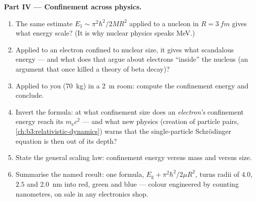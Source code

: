 \begin{problem}
\medskip\noindent\textbf{Part IV --- Confinement across physics.}
\begin{enumerate}[resume]
  \item The same estimate $E_1 \sim \pi^2\hbar^2/2MR^2$ applied to a
        nucleon in $R = \qty{3}{fm}$ gives what energy scale? (It is
        why nuclear physics speaks MeV.)
  \item Applied to an electron confined to nuclear size, it gives
        what scandalous energy --- and what does that argue about
        electrons ``inside'' the nucleus (an argument that once
        killed a theory of beta decay)?
  \item Applied to you (\qty{70}{kg}) in a \qty{2}{m} room: compute
        the confinement energy and conclude.
  \item Invert the formula: at what confinement size does an
        \emph{electron's} confinement energy reach its 
        $m_{\text{e}}c^2$ --- and what new physics (creation of
        particle pairs, \cref{ch:b3:relativistic-dynamics}) warns
        that the single-particle Schrödinger equation is then out of
        its depth?
  \item State the general scaling law: confinement energy versus
        mass and versus size.
  \item Summarise the named result: one formula,
        $E_{\text{g}} + \pi^2\hbar^2/2\mu R^2$, turns radii of
        $4.0$, $2.5$ and \qty{2.0}{nm} into red, green and blue ---
        colour engineered by counting nanometres, on sale in any
        electronics shop.
\end{enumerate}
\end{problem}
